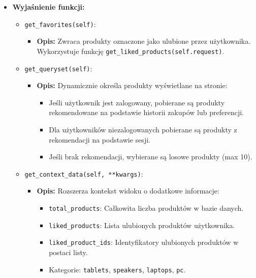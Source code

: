 \documentclass[12pt,a4paper,oneside]{article}
\theoremstyle{definition}
\numberwithin{equation}{section}
\begin{document}
\begin{itemize}
    \item \textbf{Wyjaśnienie funkcji:}
        \begin{itemize}
            \item \texttt{get\_favorites(self)}:
            \begin{itemize}
                \item \textbf{Opis:} Zwraca produkty oznaczone jako ulubione przez użytkownika. Wykorzystuje funkcję \texttt{get\_liked\_products(self.request)}.
            \end{itemize}
            \item \texttt{get\_queryset(self)}:
            \begin{itemize}
                \item \textbf{Opis:} Dynamicznie określa produkty wyświetlane na stronie:
                \begin{itemize}
                    \item Jeśli użytkownik jest zalogowany, pobierane są produkty rekomendowane na podstawie historii zakupów lub preferencji.
                    \item Dla użytkowników niezalogowanych pobierane są produkty z rekomendacji na podstawie sesji.
                    \item Jeśli brak rekomendacji, wybierane są losowe produkty (max 10).
                \end{itemize}
            \end{itemize}
            \item \texttt{get\_context\_data(self, **kwargs)}:
            \begin{itemize}
                \item \textbf{Opis:} Rozszerza kontekst widoku o dodatkowe informacje:
                \begin{itemize}
                    \item \texttt{total\_products}: Całkowita liczba produktów w bazie danych.
                    \item \texttt{liked\_products}: Lista ulubionych produktów użytkownika.
                    \item \texttt{liked\_product\_ids}: Identyfikatory ulubionych produktów w postaci listy.
                    \item Kategorie: \texttt{tablets}, \texttt{speakers}, \texttt{laptops}, \texttt{pc}.
                \end{itemize}
            \end{itemize}
        \end{itemize}


\end{itemize}
\end{document}
